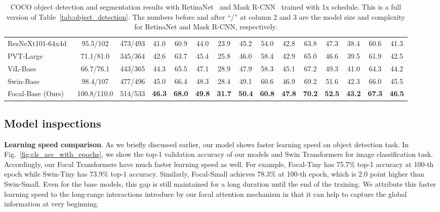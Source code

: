 \documentclass{article}
\begin{document}
\begin{table}[t]
\begin{center}
{\begin{tabular}{l|cc|cccccc|cccccc}
\midrule
ResNeXt101-64x4d~\cite{xie2017aggregated} & 95.5/102 & 473/493 & 41.0 & 60.9 & 44.0 & 23.9 & 45.2 & 54.0 & 42.8 & 63.8 & 47.3 & 38.4 & 60.6 & 41.3 \\
PVT-Large\cite{wang2021pyramid} & 71.1/81.0 & 345/364 & 42.6 & 63.7 & 45.4 & 25.8 & 46.0 & 58.4 & 42.9 & 65.0 & 46.6 & 39.5 & 61.9 & 42.5 \\
ViL-Base~\cite{zhang2021multi} & 66.7/76.1 & 443/365 & 44.3 & 65.5 & 47.1 & 28.9 & 47.9 & 58.3 & 45.1 & 67.2 & 49.3 & 41.0 & 64.3 & 44.2 \\
Swin-Base~\cite{liu2021swin} & 98.4/107 & 477/496 & 45.0 & 66.4 & 48.3 & 28.4 & 49.1 & 60.6 & 46.9 & 69.2 & 51.6 & 42.3 & 66.0 & 45.5 \\
Focal-Base (Ours) & 100.8/110.0 & 514/533 & \textbf{46.3} & \textbf{68.0} & \textbf{49.8} & \textbf{31.7} & \textbf{50.4} & \textbf{60.8} & \textbf{47.8} & \textbf{70.2} & \textbf{52.5} & \textbf{43.2} & \textbf{67.3} & \textbf{46.5} \\
\bottomrule
\end{tabular}}
\end{center}
\vspace{1pt}
\caption{COCO object detection and segmentation results with RetinaNet~\cite{lin2017focal} and Mask R-CNN~\cite{he2016deep} trained with 1x schedule. This is a full version of Table~\ref{tab:object_detection}. The numbers before and after ``/'' at column 2 and 3 are the model size and complexity for RetinaNet and Mask R-CNN, respectively.}
\label{tab:object_detection_1x}
\vspace{-2mm}
\end{table}
\vspace{-5pt}


\subsection{Model inspections}
\textbf{Learning speed comparison}. As we briefly discussed earlier, our model shows faster learning speed on object detection task. In Fig.~\ref{fig:cls_acc_with_epochs}, we show the top-1 validation accuracy of our models and Swin Transformers for image classification task. Accordingly, our Focal Transformers have much faster learning speed as well. For example, Focal-Tiny has 75.7\% top-1 accuracy at 100-th epoch while Swin-Tiny has 73.9\% top-1 accuracy. Similarly, Focal-Small achieves 78.3\% at 100-th epoch, which is 2.0 point higher than Swin-Small. Even for the base models, this gap is still maintained for a long duration until the end of the training. We attribute this faster learning speed to the long-range interactions introduce by our focal attention mechanism in that it can help to capture the global information at very beginning.
\end{document}
